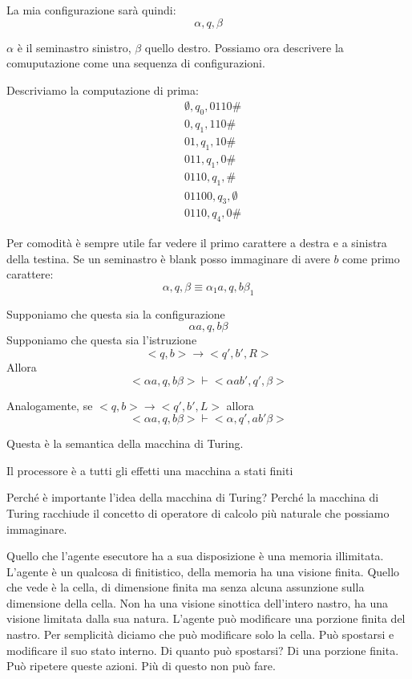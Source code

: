 La mia configurazione sarà quindi:
\begin{equation*}
    \alpha,q,\beta
\end{equation*}

$\alpha$ è il seminastro sinistro, $\beta$ quello destro. Possiamo ora descrivere la comuputazione come
una sequenza di configurazioni.

Descriviamo la computazione di prima:
\begin{align*}
    &\emptyset,q_{0},0110\#\\
    &0,q_{1},110\#\\
    &01,q_{1},10\#\\
    &011,q_{1},0\#\\
    &0110,q_{1},\#\\
    &01100,q_{3},\emptyset\\
    &0110,q_{4},0\#
\end{align*}

Per comodità è sempre utile far vedere il primo carattere a destra e a sinistra della testina. Se
un seminastro è blank posso immaginare di avere $b$ come primo carattere:
\begin{equation*}
    \alpha,q,\beta \equiv \alpha_{1} a,q,b\beta_{1}
\end{equation*}

Supponiamo che questa sia la configurazione
\begin{equation*}
    \alpha a,q,b \beta
\end{equation*}
Supponiamo che questa sia l'istruzione
\begin{equation*}
    <q,b> \to <q',b',R>
\end{equation*}
Allora
\begin{equation*}
    <\alpha a,q,b \beta> \vdash <\alpha ab',q',\beta>
\end{equation*}

Analogamente, se $<q,b> \to <q',b',L>$ allora
\begin{equation*}
    <\alpha a,q,b \beta> \vdash <\alpha ,q',ab'\beta>
\end{equation*}

Questa è la semantica della macchina di Turing.

Il processore è a tutti gli effetti una macchina a stati finiti

Perché è importante l'idea della macchina di Turing? Perché la macchina di Turing racchiude il
concetto di operatore di calcolo più naturale che possiamo immaginare. 

Quello che l'agente esecutore ha a sua disposizione è una memoria illimitata. L'agente è un qualcosa
di finitistico, della memoria ha una visione finita. Quello che vede è la cella, di dimensione
finita ma senza alcuna assunzione sulla dimensione della cella. Non ha una visione sinottica
dell'intero nastro, ha una visione limitata dalla sua natura. L'agente può modificare una porzione
finita del nastro. Per semplicità diciamo che può modificare solo la cella.  Può spostarsi e
modificare il suo stato interno. Di quanto può spostarsi? Di una porzione finita. Può ripetere
queste azioni. Più di questo non può fare.


